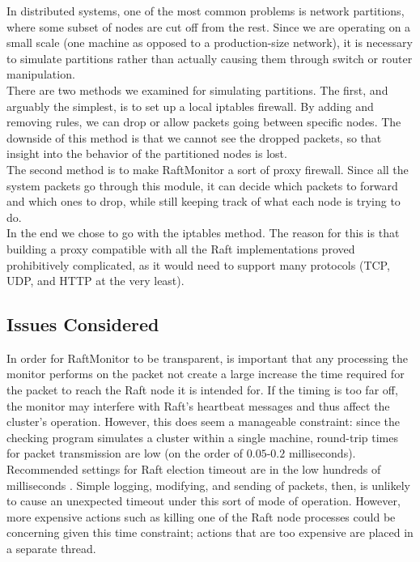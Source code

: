 \documentclass[UTF8]{article}
\begin{document}
In distributed systems, one of the most common problems is network partitions, where some subset of nodes are cut off from the rest. Since we are operating on a small scale (one machine as opposed to a production-size network), it is necessary to simulate partitions rather than actually causing them through switch or router manipulation.
\\ \indent There are two methods we examined for simulating partitions. The first, and arguably the simplest, is to set up a local iptables firewall. By adding and removing rules, we can drop or allow packets going between specific nodes. The downside of this method is that we cannot see the dropped packets, so that insight into the behavior of the partitioned nodes is lost.
\\ \indent The second method is to make RaftMonitor a sort of proxy firewall. Since all the system packets go through this module, it can decide which packets to forward and which ones to drop, while still keeping track of what each node is trying to do.
\\ \indent In the end we chose to go with the iptables method. The reason for this is that building a proxy compatible with all the Raft implementations proved prohibitively complicated, as it would need to support many protocols (TCP, UDP, and HTTP at the very least). 

\subsection{Issues Considered}

In order for RaftMonitor to be transparent, is important that any processing the monitor performs on the packet not create a large increase the time required for the packet to reach the Raft node it is intended for. If the timing is too far off, the monitor may interfere with Raft's heartbeat messages and thus affect the cluster's operation. However, this does seem a manageable constraint: since the checking program simulates a cluster within a single machine, round-trip times for packet transmission are low (on the order of $0.05$-$0.2$ milliseconds). Recommended settings for Raft election timeout are in the low hundreds of milliseconds \cite{raftPaper}. Simple logging, modifying, and sending of packets, then, is unlikely to cause an unexpected timeout under this sort of mode of operation. However, more expensive actions such as killing one of the Raft node processes could be concerning given this time constraint; actions that are too expensive are placed in a separate thread.
\end{document}
